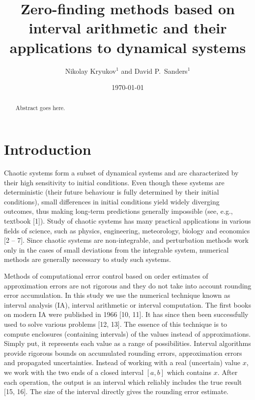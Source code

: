 \documentclass[pre, amsmath, amssymb, onecolumn, showpacs]{revtex4-1}
\begin{document}
\title{Zero-finding methods based on interval arithmetic and their applications to dynamical systems}

\author{Nikolay Kryukov$^{1}$ and David P.~Sanders$^{1}$}

\address{$^{1}$Departamento de F\'isica, Facultad de Ciencias, Universidad Nacional
Aut\'onoma de M\'exico,
Ciudad Universitaria, M\'exico D.F.\ 04510, Mexico
}

 \date{\today}


\begin{abstract}

Abstract goes here.

\end{abstract}

\maketitle

\section{Introduction}

Chaotic systems form a subset of dynamical systems and are characterized by their high sensitivity to initial conditions. Even though these systems are deterministic (their future behaviour is fully determined by their initial conditions), small differences in initial conditions yield widely diverging outcomes, thus making long-term predictions generally impossible (see, e.g., textbook [1]). Study of chaotic systems has many practical applications in various fields of science, such as physics, engineering, meteorology, biology and economics [2 – 7]. Since chaotic systems are non-integrable, and perturbation methods work only in the cases of small deviations from the integrable system, numerical methods are generally necessary to study such systems.

Methods of computational error control based on order estimates of approximation errors are not rigorous and they do not take into account rounding error accumulation. In this study we use the numerical technique known as interval analysis (IA), interval arithmetic or interval computation. The first books on modern IA were published in 1966 [10, 11]. It has since then been successfully used to solve various problems [12, 13]. The essence of this technique is to compute enclosures (containing intervals) of the values instead of approximations. Simply put, it represents each value as a range of possibilities. Interval algorithms provide rigorous bounds on accumulated rounding errors, approximation errors and propagated uncertainties. Instead of working with a real (uncertain) value $x$, we work with the two ends of a closed interval $[a, b]$ which contains $x$. After each operation, the output is an interval which reliably includes the true result [15, 16]. The size of the interval directly gives the rounding error estimate.
\end{document}
